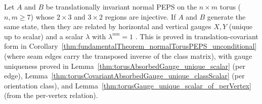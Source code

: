 \begin{corollary}%
    \label{thm:fundamentalTheorem_normalTorusPEPS}
    \leanok
    Let $A$ and $B$ be translationally invariant normal PEPS on the $n\times m$
    torus ($n,m\ge 7$) whose $2\times 3$ and $3\times 2$ regions are injective.
    If $A$ and $B$ generate the same state, then they are related by horizontal
    and vertical gauges $X,Y$ (unique up to scalar) and a scalar $\lambda$ with
    $\lambda^{nm}=1$ \cite[Theorem~3]{Molnar2018NormalPEPS}.
    This is proved in translation-covariant form in
    Corollary~\ref{thm:fundamentalTheorem_normalTorusPEPS_unconditional} (where
    seam edges carry the transposed inverse of the class matrix), with gauge
    uniqueness proved in Lemma~\ref{thm:torusAbsorbedGauge_unique_scalar} (per
    edge), Lemma~\ref{thm:torusCovariantAbsorbedGauge_unique_classScalar} (per
    orientation class), and Lemma~\ref{thm:torusGauge_unique_scalar_of_perVertex}
    (from the per-vertex relation).
\end{corollary}

